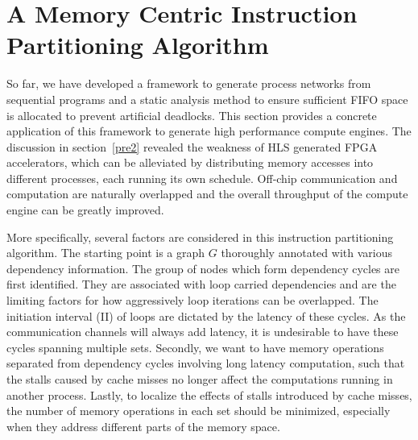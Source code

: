 \documentclass{sig-alternate}
\begin{document}
\section{A Memory Centric Instruction Partitioning Algorithm}
\label{exampleAlgo}
So far, we have developed a framework to generate process networks from  sequential programs and a static analysis method to ensure sufficient FIFO space is allocated to prevent artificial deadlocks. This section provides a concrete application of this
framework to generate high performance compute engines. The discussion in section~\ref{pre2} revealed the weakness of HLS generated FPGA accelerators, which
can be
alleviated by distributing memory accesses into different processes, each running its own schedule. Off-chip communication
and computation are naturally overlapped and the overall throughput of the compute
engine can be greatly improved.

More specifically, several factors are considered in this instruction partitioning algorithm. The starting point is a graph $G$ thoroughly annotated with various dependency information. The group of nodes which form dependency cycles are first identified. They are associated with loop carried dependencies and are the limiting factors for how aggressively loop iterations can be overlapped. The initiation
interval (II) of loops are dictated by the latency of these cycles.
As the communication channels will always add latency, it is undesirable to have
these cycles spanning multiple sets.
Secondly, we want to have memory operations separated from dependency cycles involving long latency computation, such that the stalls caused by cache misses no longer affect the computations running in another process. Lastly, to
localize the effects of stalls introduced by cache misses, the
number of memory operations in each set should be
minimized, especially when they address different parts of the
memory space.
\end{document}
